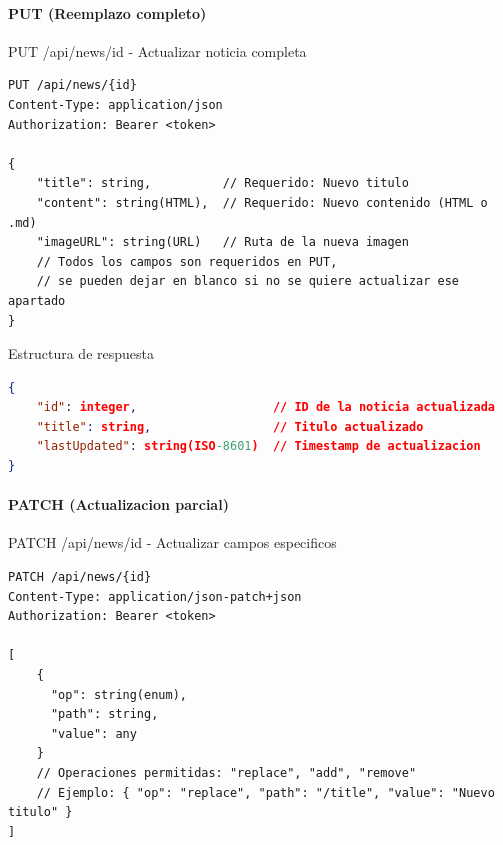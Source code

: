 \documentclass[11pt,a4paper]{article}
\begin{document}
\paragraph{PUT (Reemplazo completo)}
\begin{center}
	\begin{minipage}{\textwidth}
		\begin{codebox}{PUT /api/news/{id} - Actualizar noticia completa}
			\begin{lstlisting}[language=HTTP]
PUT /api/news/{id}
Content-Type: application/json
Authorization: Bearer <token>

{
    "title": string,          // Requerido: Nuevo titulo
    "content": string(HTML),  // Requerido: Nuevo contenido (HTML o .md)
    "imageURL": string(URL)   // Ruta de la nueva imagen
    // Todos los campos son requeridos en PUT, 
    // se pueden dejar en blanco si no se quiere actualizar ese apartado
}
\end{lstlisting}
		\end{codebox}
	\end{minipage}
\end{center}

\begin{center}
	\begin{minipage}{\textwidth}
		\begin{codebox}{Estructura de respuesta}
			\begin{lstlisting}[language=json]
{
    "id": integer,                   // ID de la noticia actualizada
    "title": string,                 // Titulo actualizado
    "lastUpdated": string(ISO-8601)  // Timestamp de actualizacion
}
\end{lstlisting}
		\end{codebox}
	\end{minipage}
\end{center}

\paragraph{PATCH (Actualizacion parcial)}
\begin{center}
	\begin{minipage}{\textwidth}
		\begin{codebox}{PATCH /api/news/{id} - Actualizar campos especificos}
			\begin{lstlisting}[language=HTTP]
PATCH /api/news/{id}
Content-Type: application/json-patch+json
Authorization: Bearer <token>

[
    { 
      "op": string(enum), 
      "path": string, 
      "value": any 
    }
    // Operaciones permitidas: "replace", "add", "remove"
    // Ejemplo: { "op": "replace", "path": "/title", "value": "Nuevo titulo" }
]
\end{lstlisting}
		\end{codebox}
	\end{minipage}
\end{center}
\end{document}

